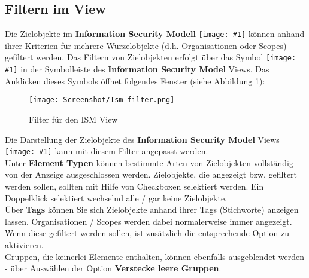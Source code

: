 \documentclass[a4paper,10pt]{book}
\newcommand{\icon}[1]{\texttt{[image: \#1]}}
\begin{document}
\subsection{Filtern im View}
Die Zielobjekte im \textbf{Information Security Modell} \icon{Icon/Informationssicherheitsmodell.png} können
anhand ihrer Kriterien für mehrere Wurzelobjekte (d.h. Organisationen oder Scopes) gefiltert werden.
Das Filtern von Zielobjekten erfolgt über das Symbol \icon{Icon/Filter.png} in der Symbolleiste des \textbf{Information Security Model} Views.
Das Anklicken dieses Symbols öffnet folgendes Fenster (siehe Abbildung \ref{Filter fuer den ISM View}):
\newline
\begin{figure}[htb!]
  \centering
  \texttt{[image: Screenshot/Ism-filter.png]}
  \caption{\label{Filter fuer den ISM View} Filter für den ISM View}
\end{figure}
\newline
Die Darstellung der Zielobjekte des \textbf{Information Security Model} Views \icon{Icon/Informationssicherheitsmodell.png} kann
mit diesem Filter angepasst werden.
\newline\\
Unter \textbf{Element Typen} können bestimmte Arten von Zielobjekten vollständig von der Anzeige ausgeschlossen werden. Zielobjekte,
die angezeigt bzw. gefiltert werden sollen, sollten mit Hilfe von Checkboxen selektiert werden. Ein Doppelklick selektiert
wechselnd alle / gar keine Zielobjekte.
\newline\\
Über \textbf{Tags} können Sie sich Zielobjekte anhand ihrer Tags (Stichworte) anzeigen lassen. Organisationen / Scopes werden dabei normalerweise
immer angezeigt. Wenn diese gefiltert werden sollen, ist zusätzlich die entsprechende Option zu aktivieren.
\newline\\
Gruppen, die keinerlei Elemente enthalten, können ebenfalls ausgeblendet werden - über Auswählen der Option \textbf{Verstecke leere Gruppen}.
\end{document}
